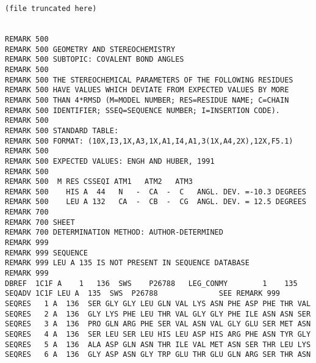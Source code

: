 \begin{lstlisting}
(file truncated here)


REMARK 500                                                                      
REMARK 500 GEOMETRY AND STEREOCHEMISTRY                                         
REMARK 500 SUBTOPIC: COVALENT BOND ANGLES                                       
REMARK 500                                                                      
REMARK 500 THE STEREOCHEMICAL PARAMETERS OF THE FOLLOWING RESIDUES              
REMARK 500 HAVE VALUES WHICH DEVIATE FROM EXPECTED VALUES BY MORE               
REMARK 500 THAN 4*RMSD (M=MODEL NUMBER; RES=RESIDUE NAME; C=CHAIN               
REMARK 500 IDENTIFIER; SSEQ=SEQUENCE NUMBER; I=INSERTION CODE).                 
REMARK 500                                                                      
REMARK 500 STANDARD TABLE:                                                      
REMARK 500 FORMAT: (10X,I3,1X,A3,1X,A1,I4,A1,3(1X,A4,2X),12X,F5.1)              
REMARK 500                                                                      
REMARK 500 EXPECTED VALUES: ENGH AND HUBER, 1991                                
REMARK 500                                                                      
REMARK 500  M RES CSSEQI ATM1   ATM2   ATM3                                     
REMARK 500    HIS A  44   N   -  CA  -  C   ANGL. DEV. =-10.3 DEGREES           
REMARK 500    LEU A 132   CA  -  CB  -  CG  ANGL. DEV. = 12.5 DEGREES           
REMARK 700                                                                      
REMARK 700 SHEET                                                                
REMARK 700 DETERMINATION METHOD: AUTHOR-DETERMINED                              
REMARK 999                                                                      
REMARK 999 SEQUENCE                                                             
REMARK 999 LEU A 135 IS NOT PRESENT IN SEQUENCE DATABASE                        
REMARK 999                                                                      
DBREF  1C1F A    1   136  SWS    P26788   LEG_CONMY        1    135             
SEQADV 1C1F LEU A  135  SWS  P26788              SEE REMARK 999                 
SEQRES   1 A  136  SER GLY GLY LEU GLN VAL LYS ASN PHE ASP PHE THR VAL          
SEQRES   2 A  136  GLY LYS PHE LEU THR VAL GLY GLY PHE ILE ASN ASN SER          
SEQRES   3 A  136  PRO GLN ARG PHE SER VAL ASN VAL GLY GLU SER MET ASN          
SEQRES   4 A  136  SER LEU SER LEU HIS LEU ASP HIS ARG PHE ASN TYR GLY          
SEQRES   5 A  136  ALA ASP GLN ASN THR ILE VAL MET ASN SER THR LEU LYS          
SEQRES   6 A  136  GLY ASP ASN GLY TRP GLU THR GLU GLN ARG SER THR ASN          

\end{lstlisting}
